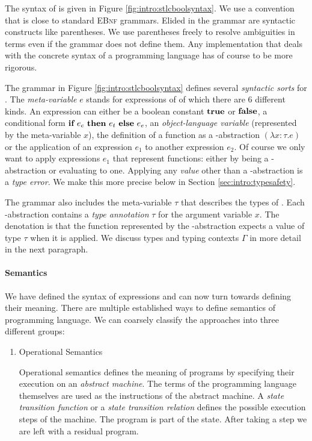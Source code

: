 {The syntax of \stlcbool is given in Figure \ref{fig:intro:stlcboolsyntax}. We
use a convention that is close to standard \textsc{EBnf} grammars. Elided in the
grammar are syntactic constructs like parentheses. We use parentheses freely to
resolve ambiguities in terms even if the grammar does not define them. Any
implementation that deals with the concrete syntax of a programming language has
of course to be more rigorous.

The grammar in Figure \ref{fig:intro:stlcboolsyntax} defines several
\emph{syntactic sorts} for \stlcbool. The \emph{meta-variable} $e$ stands for
expressions of \stlcbool of which there are 6 different kinds. An expression can
either be a boolean constant $\textbf{true}$ or $\textbf{false}$, a conditional form
$\textbf{if}~{e_c}~\textbf{then}~{e_t}~\textbf{else}~{e_e}$, an \emph{object-language variable} (represented by the
meta-variable $x$), the definition of a function as a \textlambda-abstraction
$(\lambda x:\tau.e)$ or the application of an expression $e_1$ to another
expression $e_2$. Of course we only want to apply expressions $e_1$ that
represent functions: either by being a \textlambda-abstraction or evaluating to
one. Applying any \emph{value} other than a \textlambda-abstraction is a
\emph{type error}. We make this more precise below in Section
\ref{sec:intro:typesafety}.

The grammar also includes the meta-variable $\tau$ that describes the types of
\stlcbool. Each \textlambda-abstraction contains a \emph{type annotation} $\tau$
for the argument variable $x$. The denotation is that the function represented
by the \textlambda-abstraction expects a value of type $\tau$ when it is
applied. We discuss types and typing contexts $\Gamma$ in more detail in the
next paragraph.


\paragraph{Semantics}

We have defined the syntax of \stlcbool expressions and can now turn towards
defining their meaning. There are multiple established ways to define semantics
of programming language. We can coarsely classify the approaches into three
different groups:

\begin{enumerate}
\item Operational Semantics

  Operational semantics defines the meaning of programs by specifying their
  execution on an \emph{abstract machine}. The terms of the programming language
  themselves are used as the instructions of the abstract machine. A \emph{state
    transition function} or a \emph{state transition relation} defines the
  possible execution steps of the machine. The program is part of the state.
  After taking a step we are left with a residual program.


\end{enumerate}}
